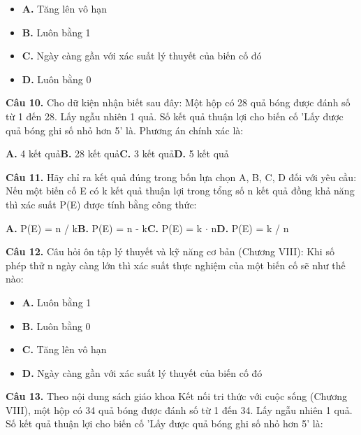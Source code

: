 \documentclass[11pt,a4paper]{article}
\begin{document}
\begin{itemize}\setlength{\itemsep}{1pt}\setlength{\parskip}{0pt}
  \item[] \textbf{A.} Tăng lên vô hạn
  \item[] \textbf{B.} Luôn bằng 1
  \item[] \textbf{C.} Ngày càng gần với xác suất lý thuyết của biến cố đó
  \item[] \textbf{D.} Luôn bằng 0
\end{itemize}\vspace{2pt}
\textbf{\color{primary} Câu 10.} Cho dữ kiện nhận biết sau đây: Một hộp có 28 quả bóng được đánh số từ 1 đến 28. Lấy ngẫu nhiên 1 quả. Số kết quả thuận lợi cho biến cố 'Lấy được quả bóng ghi số nhỏ hơn 5' là. Phương án chính xác là:\par
\hspace*{1.5em}\textbf{A.} 4 kết quả\quad\quad \textbf{B.} 28 kết quả\quad\quad \textbf{C.} 3 kết quả\quad\quad \textbf{D.} 5 kết quả\par\vspace{2pt}
\textbf{\color{primary} Câu 11.} Hãy chỉ ra kết quả đúng trong bốn lựa chọn A, B, C, D đối với yêu cầu: Nếu một biến cố E có k kết quả thuận lợi trong tổng số n kết quả đồng khả năng thì xác suất P(E) được tính bằng công thức:\par
\hspace*{1.5em}\textbf{A.} P(E) = n / k\quad\quad \textbf{B.} P(E) = n - k\quad\quad \textbf{C.} P(E) = k $\cdot$ n\quad\quad \textbf{D.} P(E) = k / n\par\vspace{2pt}
\textbf{\color{primary} Câu 12.} Câu hỏi ôn tập lý thuyết và kỹ năng cơ bản (Chương VIII): Khi số phép thử n ngày càng lớn thì xác suất thực nghiệm của một biến cố sẽ như thế nào:\par
\begin{itemize}\setlength{\itemsep}{1pt}\setlength{\parskip}{0pt}
  \item[] \textbf{A.} Luôn bằng 1
  \item[] \textbf{B.} Luôn bằng 0
  \item[] \textbf{C.} Tăng lên vô hạn
  \item[] \textbf{D.} Ngày càng gần với xác suất lý thuyết của biến cố đó
\end{itemize}\vspace{2pt}
\textbf{\color{primary} Câu 13.} Theo nội dung sách giáo khoa Kết nối tri thức với cuộc sống (Chương VIII), một hộp có 34 quả bóng được đánh số từ 1 đến 34. Lấy ngẫu nhiên 1 quả. Số kết quả thuận lợi cho biến cố 'Lấy được quả bóng ghi số nhỏ hơn 5' là:\par
\end{document}

